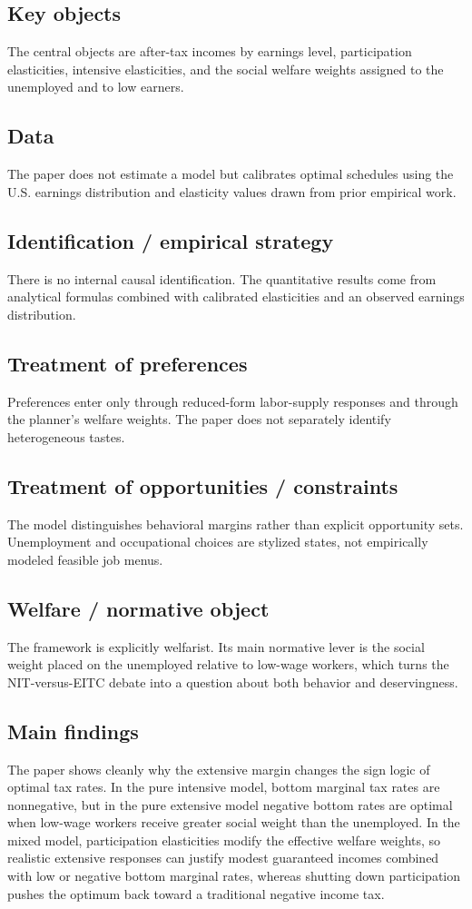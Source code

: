 \documentclass[11pt,a4paper]{article}
\begin{document}
\subsection*{Key objects}
The central objects are after-tax incomes by earnings level, participation elasticities, intensive elasticities, and the social welfare weights assigned to the unemployed and to low earners.

\subsection*{Data}
The paper does not estimate a model but calibrates optimal schedules using the U.S. earnings distribution and elasticity values drawn from prior empirical work.

\subsection*{Identification / empirical strategy}
There is no internal causal identification. The quantitative results come from analytical formulas combined with calibrated elasticities and an observed earnings distribution.

\subsection*{Treatment of preferences}
Preferences enter only through reduced-form labor-supply responses and through the planner’s welfare weights. The paper does not separately identify heterogeneous tastes.

\subsection*{Treatment of opportunities / constraints}
The model distinguishes behavioral margins rather than explicit opportunity sets. Unemployment and occupational choices are stylized states, not empirically modeled feasible job menus.

\subsection*{Welfare / normative object}
The framework is explicitly welfarist. Its main normative lever is the social weight placed on the unemployed relative to low-wage workers, which turns the NIT-versus-EITC debate into a question about both behavior and deservingness.

\subsection*{Main findings}
The paper shows cleanly why the extensive margin changes the sign logic of optimal tax rates. In the pure intensive model, bottom marginal tax rates are nonnegative, but in the pure extensive model negative bottom rates are optimal when low-wage workers receive greater social weight than the unemployed. In the mixed model, participation elasticities modify the effective welfare weights, so realistic extensive responses can justify modest guaranteed incomes combined with low or negative bottom marginal rates, whereas shutting down participation pushes the optimum back toward a traditional negative income tax.
\end{document}
